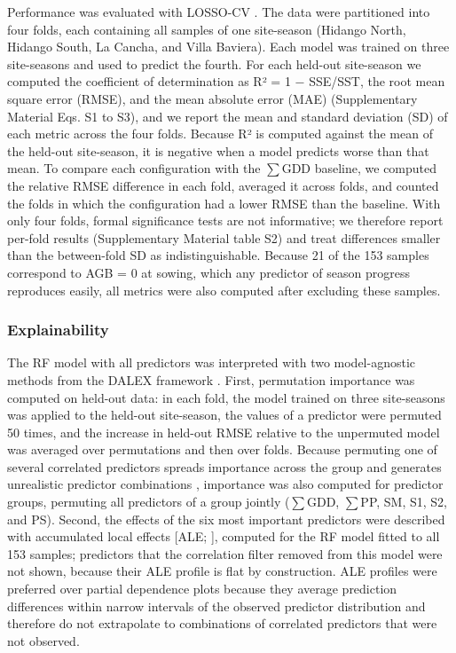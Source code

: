 \documentclass[
  british,
]{interact}
\begin{document}
Performance was evaluated with LOSSO-CV \citep{Roberts2017, Meyer2021}.
The data were partitioned into four folds, each containing all samples
of one site-season (Hidango North, Hidango South, La Cancha, and Villa
Baviera). Each model was trained on three site-seasons and used to
predict the fourth. For each held-out site-season we computed the
coefficient of determination as R² = 1 − SSE/SST, the root mean square
error (RMSE), and the mean absolute error (MAE) (Supplementary Material
Eqs. S1 to S3), and we report the mean and standard deviation (SD) of
each metric across the four folds. Because R² is computed against the
mean of the held-out site-season, it is negative when a model predicts
worse than that mean. To compare each configuration with the \(\sum\)GDD
baseline, we computed the relative RMSE difference in each fold,
averaged it across folds, and counted the folds in which the
configuration had a lower RMSE than the baseline. With only four folds,
formal significance tests are not informative; we therefore report
per-fold results (Supplementary Material table S2) and treat differences
smaller than the between-fold SD as indistinguishable. Because 21 of the
153 samples correspond to AGB = 0 at sowing, which any predictor of
season progress reproduces easily, all metrics were also computed after
excluding these samples.

\subsubsection{Explainability}\label{explainability}

The RF model with all predictors was interpreted with two model-agnostic
methods from the DALEX framework \citep{Biecek2018}. First, permutation
importance was computed on held-out data: in each fold, the model
trained on three site-seasons was applied to the held-out site-season,
the values of a predictor were permuted 50 times, and the increase in
held-out RMSE relative to the unpermuted model was averaged over
permutations and then over folds. Because permuting one of several
correlated predictors spreads importance across the group and generates
unrealistic predictor combinations \citep{Strobl2008}, importance was
also computed for predictor groups, permuting all predictors of a group
jointly (\(\sum\)GDD, \(\sum\)PP, SM, S1, S2, and PS). Second, the
effects of the six most important predictors were described with
accumulated local effects {[}ALE; \citet{Apley2020}{]}, computed for the
RF model fitted to all 153 samples; predictors that the correlation
filter removed from this model were not shown, because their ALE profile
is flat by construction. ALE profiles were preferred over partial
dependence plots because they average prediction differences within
narrow intervals of the observed predictor distribution and therefore do
not extrapolate to combinations of correlated predictors that were not
observed.
\end{document}
